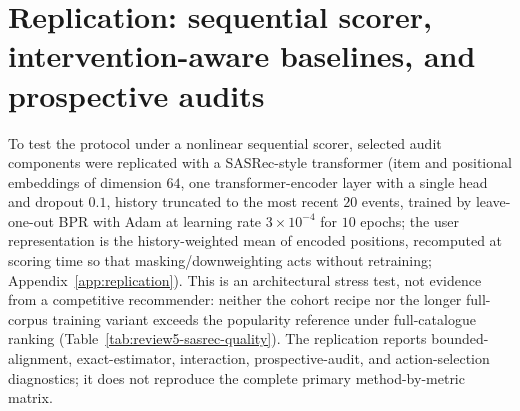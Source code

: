 \documentclass[manuscript,screen,anonymous]{acmart}
\begin{document}
\section{Replication: sequential scorer, intervention-aware baselines, and prospective audits}\label{app:replication-sec}\label{app:replication}
To test the protocol under a nonlinear sequential scorer, selected audit components were replicated with a SASRec-style transformer (item and positional embeddings of dimension $64$, one transformer-encoder layer with a single head and dropout $0.1$, history truncated to the most recent $20$ events, trained by leave-one-out BPR with Adam at learning rate $3\times10^{-4}$ for $10$ epochs; the user representation is the history-weighted mean of encoded positions, recomputed at scoring time so that masking/downweighting acts without retraining; Appendix~\ref{app:replication}). This is an architectural stress test, not evidence from a competitive recommender: neither the cohort recipe nor the longer full-corpus training variant exceeds the popularity reference under full-catalogue ranking (Table~\ref{tab:review5-sasrec-quality}). The replication reports bounded-alignment, exact-estimator, interaction, prospective-audit, and action-selection diagnostics; it does not reproduce the complete primary method-by-metric matrix.
\end{document}
